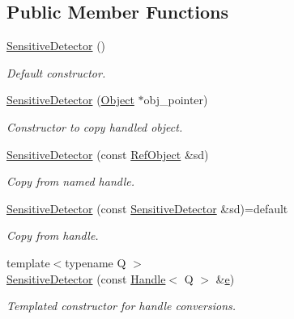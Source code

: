 \subsection*{Public Member Functions}
\begin{DoxyCompactItemize}
\item 
\hyperlink{class_d_d4hep_1_1_geometry_1_1_sensitive_detector_a7582e36657fd4099441d82cdf12fe638}{Sensitive\+Detector} ()
\begin{DoxyCompactList}\small\item\em Default constructor. \end{DoxyCompactList}\item 
\hyperlink{class_d_d4hep_1_1_geometry_1_1_sensitive_detector_a52024ca16cb8a4a3d81802ba224efbe3}{Sensitive\+Detector} (\hyperlink{class_d_d4hep_1_1_geometry_1_1_sensitive_detector_a0d3dbe95cad52849050e35e70a5cf784}{Object} $\ast$obj\+\_\+pointer)
\begin{DoxyCompactList}\small\item\em Constructor to copy handled object. \end{DoxyCompactList}\item 
\hyperlink{class_d_d4hep_1_1_geometry_1_1_sensitive_detector_a6cdd000bbf0d6712cdf5348a4d909198}{Sensitive\+Detector} (const \hyperlink{class_d_d4hep_1_1_geometry_1_1_sensitive_detector_a6283afdc6a1de8128bd6aea54f030014}{Ref\+Object} \&sd)
\begin{DoxyCompactList}\small\item\em Copy from named handle. \end{DoxyCompactList}\item 
\hyperlink{class_d_d4hep_1_1_geometry_1_1_sensitive_detector_a91f2cd86fa60db3f97f5f1499436922a}{Sensitive\+Detector} (const \hyperlink{class_d_d4hep_1_1_geometry_1_1_sensitive_detector}{Sensitive\+Detector} \&sd)=default
\begin{DoxyCompactList}\small\item\em Copy from handle. \end{DoxyCompactList}\item 
{\footnotesize template$<$typename Q $>$ }\\\hyperlink{class_d_d4hep_1_1_geometry_1_1_sensitive_detector_a3cb77e09e42a85492f87044305b74512}{Sensitive\+Detector} (const \hyperlink{class_d_d4hep_1_1_handle}{Handle}$<$ Q $>$ \&\hyperlink{_volumes_8cpp_a8a9a1f93e9b09afccaec215310e64142}{e})
\begin{DoxyCompactList}\small\item\em Templated constructor for handle conversions. \end{DoxyCompactList}\item 

\end{DoxyCompactItemize}
